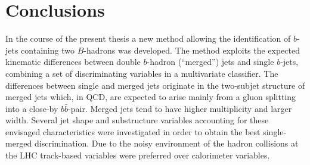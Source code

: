 %
%
\chapter{Conclusions}\label{ch:conclusions}

In the course of the present thesis a new method allowing the identification of $b$-jets containing two $B$-hadrons was developed. %
%
The method exploits the expected kinematic differences between double $b$-hadron (``merged'') jets and single $b$-jets, combining a set of discriminating variables in a multivariate classifier.  The differences between single and merged jets originate in the two-subjet structure of merged jets which, in QCD, are expected to arise mainly from a gluon splitting into a  close-by $b\bar{b}$-pair. 
Merged jets tend to have higher multiplicity and larger width. Several jet shape and substructure variables accounting for these envisaged characteristics were investigated in order to obtain the best single-merged discrimination.  Due to the noisy environment of the hadron collisions at the LHC track-based variables were preferred over calorimeter variables.   %

